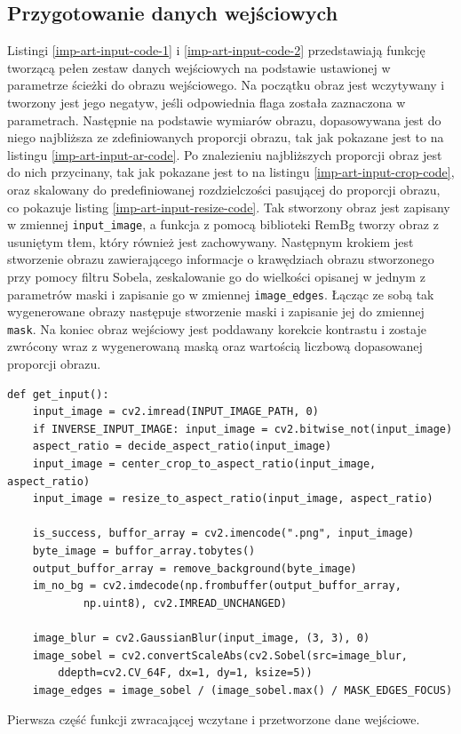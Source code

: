         \subsection{Przygotowanie danych wejściowych} \label{imp-art-prep-in}
        Listingi \ref{imp-art-input-code-1} i \ref{imp-art-input-code-2} przedstawiają funkcję tworzącą pełen zestaw danych wejściowych na podstawie ustawionej w parametrze ścieżki do obrazu wejściowego. Na początku obraz jest wczytywany i tworzony jest jego negatyw, jeśli odpowiednia flaga została zaznaczona w parametrach. Następnie na podstawie wymiarów obrazu, dopasowywana jest do niego najbliższa ze zdefiniowanych proporcji obrazu, tak jak pokazane jest to na listingu \ref{imp-art-input-ar-code}. Po znalezieniu najbliższych proporcji obraz jest do nich przycinany, tak jak pokazane jest to na listingu \ref{imp-art-input-crop-code}, oraz skalowany do predefiniowanej rozdzielczości pasującej do proporcji obrazu, co pokazuje listing \ref{imp-art-input-resize-code}. Tak stworzony obraz jest zapisany w zmiennej \texttt{input_image}, a funkcja z pomocą biblioteki RemBg tworzy obraz z usuniętym tłem, który również jest zachowywany. Następnym krokiem jest stworzenie obrazu zawierającego informacje o krawędziach obrazu stworzonego przy pomocy filtru Sobela, zeskalowanie go do wielkości opisanej w jednym z parametrów maski i zapisanie go w zmiennej \texttt{image_edges}. Łącząc ze sobą tak wygenerowane obrazy następuje stworzenie maski i zapisanie jej do zmiennej \texttt{mask}. Na koniec obraz wejściowy jest poddawany korekcie kontrastu i zostaje zwrócony wraz z wygenerowaną maską oraz wartością liczbową dopasowanej proporcji obrazu.
        
        \begin{code}[H]
        \begin{verbatim}
def get_input(): 
    input_image = cv2.imread(INPUT_IMAGE_PATH, 0)
    if INVERSE_INPUT_IMAGE: input_image = cv2.bitwise_not(input_image)
    aspect_ratio = decide_aspect_ratio(input_image)
    input_image = center_crop_to_aspect_ratio(input_image, aspect_ratio)
    input_image = resize_to_aspect_ratio(input_image, aspect_ratio)

    is_success, buffor_array = cv2.imencode(".png", input_image)
    byte_image = buffor_array.tobytes()
    output_buffor_array = remove_background(byte_image)
    im_no_bg = cv2.imdecode(np.frombuffer(output_buffor_array, 
            np.uint8), cv2.IMREAD_UNCHANGED)

    image_blur = cv2.GaussianBlur(input_image, (3, 3), 0)
    image_sobel = cv2.convertScaleAbs(cv2.Sobel(src=image_blur,
        ddepth=cv2.CV_64F, dx=1, dy=1, ksize=5))
    image_edges = image_sobel / (image_sobel.max() / MASK_EDGES_FOCUS)
        \end{verbatim}
        \caption{Pierwsza część funkcji zwracającej wczytane i przetworzone dane wejściowe.}
        \label{imp-art-input-code-1}
        \end{code}
        
